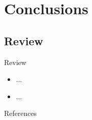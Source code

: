 \documentclass{beamer}
\begin{document}
\section{Conclusions}
\subsection{Review}

\begin{frame}{Review}

\begin{itemize}
  \itemsep12pt
  \item ...
  \item ...
\end{itemize}

\end{frame}


\setbeamercovered{}
\beamerdefaultoverlayspecification{}

\begin{frame}[c,allowframebreaks]{References}

\small

\nocite{*}

\itemize

\end{frame}

\end{document}

